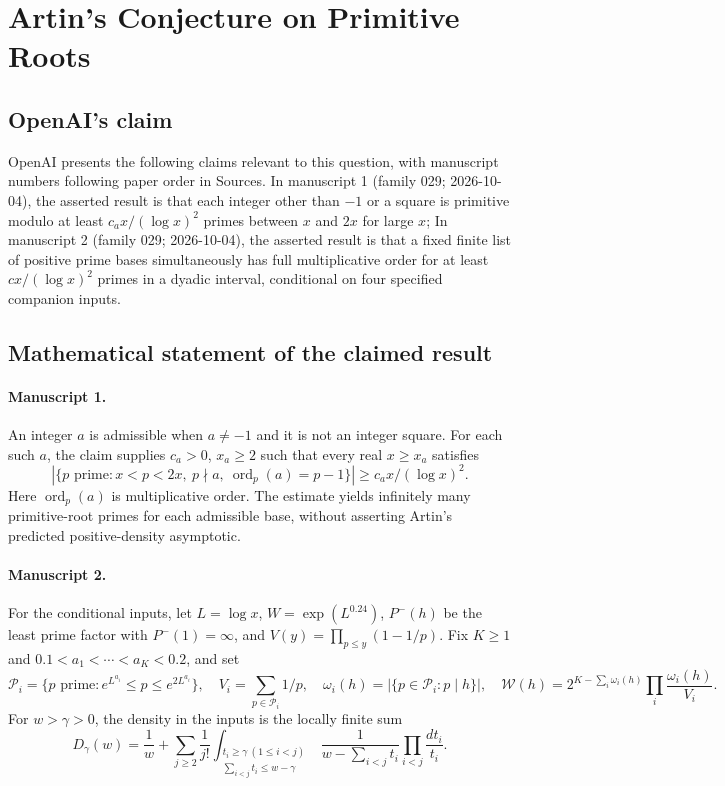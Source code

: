 \documentclass[11pt]{article}
\begin{document}
\section*{Artin's Conjecture on Primitive Roots}

\subsection{OpenAI's claim}
OpenAI presents the following claims relevant to this question, with manuscript numbers following paper order in Sources. In manuscript 1 (family 029; 2026-10-04), the asserted result is that each integer other than $-1$ or a square is primitive modulo at least $c_a x/(\log x)^2$ primes between $x$ and $2x$ for large $x$; In manuscript 2 (family 029; 2026-10-04), the asserted result is that a fixed finite list of positive prime bases simultaneously has full multiplicative order for at least $cx/(\log x)^2$ primes in a dyadic interval, conditional on four specified companion inputs.

\subsection{Mathematical statement of the claimed result}
\paragraph{Manuscript 1.}
An integer $a$ is admissible when $a\ne-1$ and it is not an integer square. For each such $a$, the claim supplies $c_a>0$, $x_a\ge2$ such that every real $x\ge x_a$ satisfies
\[
 |\{p\text{ prime}:x<p<2x,\ p\nmid a,\ \operatorname{ord}_p(a)=p-1\}|
 \ge c_a x/(\log x)^2.
\]
Here $\operatorname{ord}_p(a)$ is multiplicative order. The estimate yields infinitely many primitive-root primes for each admissible base, without asserting Artin's predicted positive-density asymptotic.

\paragraph{Manuscript 2.}
For the conditional inputs, let $L=\log x$, $W=\exp(L^{0.24})$, $P^-(h)$ be the least prime factor with $P^-(1)=\infty$, and $V(y)=\prod_{p\le y}(1-1/p)$. Fix $K\ge1$ and $0.1<a_1<\cdots<a_K<0.2$, and set
\[
 \mathcal P_i=\{p\text{ prime}:e^{L^{a_i}}\le p\le e^{2L^{a_i}}\},\quad
 V_i=\sum_{p\in\mathcal P_i}1/p,\quad\omega_i(h)=|\{p\in\mathcal P_i:p\mid h\}|,
 \quad\mathcal W(h)=2^{K-\sum_i\omega_i(h)}\prod_i\frac{\omega_i(h)}{V_i}.
\]
For $w>\gamma>0$, the density in the inputs is the locally finite sum
\[
 D_{\gamma}(w)=\frac1w+
 \sum_{j\ge2}\frac1{j!}
 \int_{\substack{t_i\ge\gamma\ (1\le i<j)\\\sum_{i<j}t_i\le w-\gamma}}
 \frac1{w-\sum_{i<j}t_i}\prod_{i<j}\frac{dt_i}{t_i}.
\]
\end{document}
